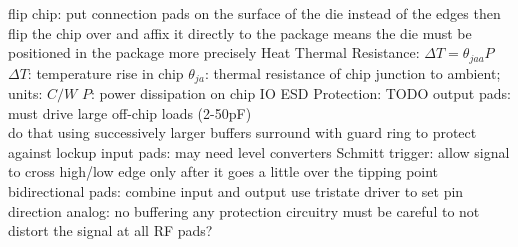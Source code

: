 \documentclass[12pt]{article}
\begin{document}
\begin{spacing}{0.8}
\begin{multicols*}{2}
\begin{flushleft}
\begin{outline}[longenum]
  \1 flip chip: put connection pads on the surface of the die instead of the edges
    \2 then flip the chip over and affix it directly to the package
    \2 means the die must be positioned in the package more precisely
  \1 Heat
    \2 Thermal Resistance: $\Delta T = \theta_{jaa} P$
      \3 $\Delta T$: temperature rise in chip
      \3 $\theta_{ja}$: thermal resistance of chip junction to ambient; units: $C/W$
      \3 $P$: power dissipation on chip
  \1 IO
    \2 ESD Protection: TODO
    \2 output pads:
      \3 must drive large off-chip loads (2-50pF)
      \\ do that using successively larger buffers
      \3 surround with guard ring to protect against lockup
    \2 input pads:
      \3 may need level converters
      \3 Schmitt trigger: allow signal to cross high/low edge only after it goes a little over the tipping point
    \2 bidirectional pads:
      \3 combine input and output
      \3 use tristate driver to set pin direction
    \2 analog:
      \3 no buffering
      \3 any protection circuitry must be careful to not distort the signal at all
      \3 RF pads?


\end{outline}
\end{flushleft}
\end{multicols*}
\end{spacing}
\end{document}
